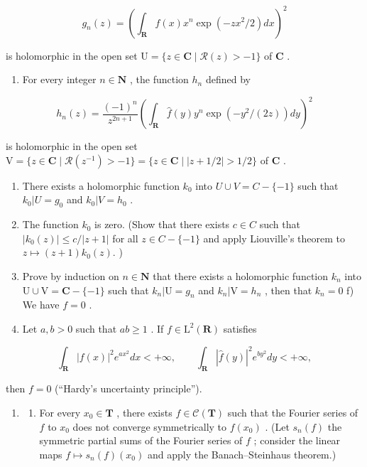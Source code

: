 \[
g _ {n} (z) = \left(\int_ {\mathbf {R}} f (x) x ^ {n} \exp (- z x ^ {2} / 2) d x\right) ^ {2}
\]

is holomorphic in the open set \(\mathrm{U} = \{z \in \mathbf{C} \mid \mathcal{R}(z) > -1\}\) of \(\mathbf{C}\) .

\begin{enumerate}
\def\labelenumi{\alph{enumi})}
\setcounter{enumi}{1}
\tightlist
\item
  For every integer \(n \in \mathbf{N}\) , the function \(h_n\) defined by
\end{enumerate}

\[
h _ {n} (z) = \frac {(- 1) ^ {n}}{z ^ {2 n + 1}} \left(\int_ {\mathbf {R}} \widehat {f} (y) y ^ {n} \exp (- y ^ {2} / (2 z)) d y\right) ^ {2}
\]

is holomorphic in the open set \(\mathrm{V} = \{z \in \mathbf{C} \mid \mathcal{R}(z^{-1}) > -1\} = \{z \in \mathbf{C} \mid |z + 1/2| > 1/2\}\) of \(\mathbf{C}\) .

\begin{enumerate}
\def\labelenumi{\alph{enumi})}
\setcounter{enumi}{2}
\item
  There exists a holomorphic function \(k_{0}\) into \(U \cup V = C - \{-1\}\) such that \(k_{0}|U = g_{0}\) and \(k_{0}|V = h_{0}\) .
\item
  The function \(k_{0}\) is zero. (Show that there exists \(c \in C\) such that \(|k_{0}(z)| \leqslant c/|z+1|\) for all \(z \in C - \{-1\}\) and apply Liouville's theorem to \(z \mapsto (z+1)k_{0}(z).\) )
\item
    Prove by induction on \(n \in \mathbf{N}\) that there exists a holomorphic function \(k_n\) into \(\mathrm{U} \cup \mathrm{V} = \mathbf{C} - \{-1\}\) such that \(k_n | \mathrm{U} = g_n\) and \(k_n | \mathrm{V} = h_n\) , then that \(k_n = 0\) f) We have \(f = 0\) .
\item
  Let \(a, b > 0\) such that \(ab \geqslant 1\) . If \(f \in \mathrm{L}^2(\mathbf{R})\) satisfies
\end{enumerate}

\[
\int_ {\mathbf {R}} | f (x) | ^ {2} e ^ {a x ^ {2}} d x <   + \infty , \qquad \int_ {\mathbf {R}} | \widehat {f} (y) | ^ {2} e ^ {b y ^ {2}} d y <   + \infty ,
\]

then \(f = 0\) (“Hardy’s uncertainty principle”).

\begin{enumerate}
\def\labelenumi{\arabic{enumi})}
\setcounter{enumi}{29}
\tightlist
\item
  \begin{enumerate}
  \def\labelenumii{\alph{enumii})}
  \tightlist
  \item
    For every \(x_0 \in \mathbf{T}\) , there exists \(f \in \mathcal{C}(\mathbf{T})\) such that the Fourier series of \(f\) to \(x_0\) does not converge symmetrically to \(f(x_0)\) . (Let \(s_n(f)\) the symmetric partial sums of the Fourier series of \(f\) ; consider the linear maps \(f \mapsto s_n(f)(x_0)\) and apply the Banach–Steinhaus theorem.)
  \end{enumerate}
\end{enumerate}

